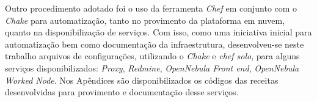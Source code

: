 \begin{apendicesenv}
Outro procedimento adotado foi o uso da ferramenta \textit{Chef} em conjunto com o \textit{Chake} para automatização, tanto no provimento da plataforma em nuvem, quanto na disponibilização de serviços. Com isso, como uma iniciativa inicial para automatização bem como documentação da infraestrutura, desenvolveu-se neste trabalho arquivos de configurações, utilizando o \textit{Chake} e \textit{chef solo}, para alguns serviços disponibilizados: \textit{Proxy}, \textit{Redmine}, \textit{OpenNebula Front end}, \textit{OpenNebula Worked Node}. Nos Apêndices são disponibilizados os códigos das receitas desenvolvidas para provimento e documentação desse serviços.














\end{apendicesenv}
